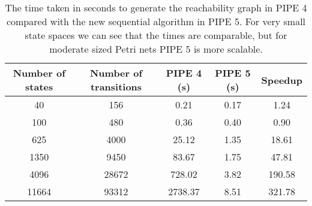 \begin{table}[tb]
\begin{center}
  \begin{tabular}{| c | c | c | c | c | }
  \hline
    Number of states & Number of transitions & PIPE 4 (s) & PIPE 5 (s) & Speedup \\
    \hline
    40 & 156 & 0.21 & 0.17 & 1.24\\
    \hline
    100 & 480 & 0.36 & 0.40 & 0.90\\
    \hline
    625 & 4000 & 25.12 & 1.35 & 18.61\\
    \hline
    1350 & 9450 & 83.67 & 1.75 & 47.81\\
    \hline
    4096 & 28672 & 728.02 & 3.82 & 190.58\\
    \hline
    11664 & 93312 & 2738.37 & 8.51 & 321.78\\
    \hline
  \end{tabular}
\caption{The time taken in seconds to generate the reachability graph in PIPE 4 compared with the new sequential algorithm in PIPE 5. For very small state spaces we can see that the times are comparable, but for moderate sized Petri nets PIPE 5 is more scalable.}
\label{tbl:pipe5_vs_pipe4_sequential}
\end{center}
\end{table}